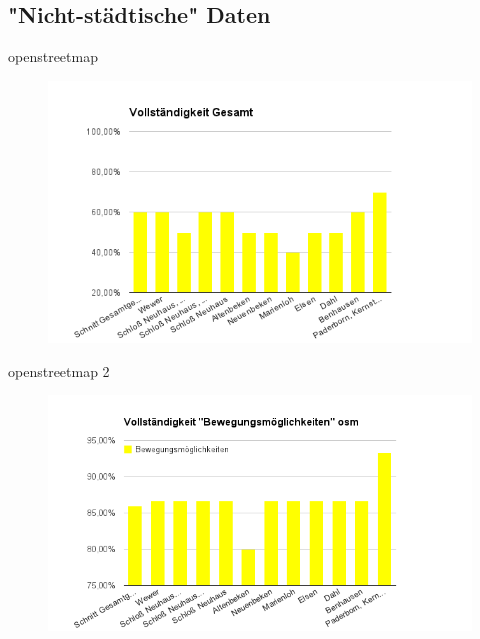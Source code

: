 \subsection{"Nicht-städtische" Daten}

\begin{frame}[t]{openstreetmap}
 \begin{figure}
  \centering
  \includegraphics[scale=0.5]{section_paderborn_osm_overall.png}
 \end{figure}
\end{frame}


\begin{frame}[t]{openstreetmap 2}
 \begin{figure}
  \centering
  \includegraphics[scale=0.5]{section_paderborn_osm_move.png}
 \end{figure}
\end{frame}



